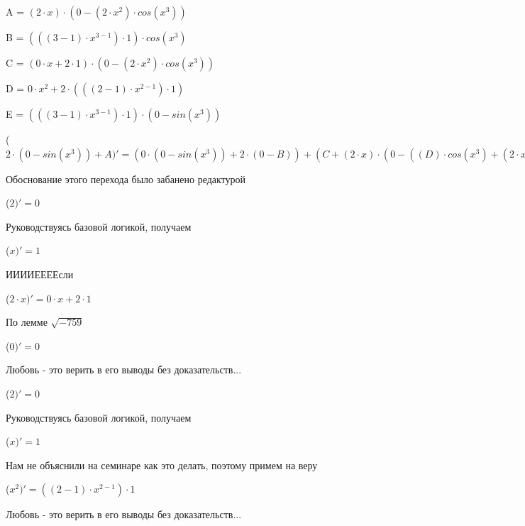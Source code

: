\documentclass[12pt,a4paper,fleqn]{article}
\begin{document}
\begin{center}
A = $(2 \cdot x) \cdot (0-(2 \cdot x^{2}) \cdot cos(x^{3}))$\end{center}
\begin{center}
B = $(((3-1) \cdot x^{3-1}) \cdot 1) \cdot cos(x^{3})$\end{center}
\begin{center}
C = $(0 \cdot x+2 \cdot 1) \cdot (0-(2 \cdot x^{2}) \cdot cos(x^{3}))$\end{center}
\begin{center}
D = $0 \cdot x^{2}+2 \cdot (((2-1) \cdot x^{2-1}) \cdot 1)$\end{center}
\begin{center}
E = $(((3-1) \cdot x^{3-1}) \cdot 1) \cdot (0-sin(x^{3}))$\end{center}
\begin{center}
 ($2 \cdot (0-sin(x^{3}))+A)'
  = (0 \cdot (0-sin(x^{3}))+2 \cdot (0-B))+(C+(2 \cdot x) \cdot (0-((D) \cdot cos(x^{3})+(2 \cdot x^{2}) \cdot (E))))$\end{center}
Обоснование этого перехода было забанено редактурой

\begin{center}
 ($2)'
  = 0$\end{center}
Руководствуясь базовой логикой, получаем

\begin{center}
 ($x)'
  = 1$\end{center}
ИИИИЕЕЕЕсли\cite{link3}

\begin{center}
 ($2 \cdot x)'
  = 0 \cdot x+2 \cdot 1$\end{center}
По лемме $\sqrt{-759}$
\begin{center}
 ($0)'
  = 0$\end{center}
Любовь - это верить в его выводы без доказательств...

\begin{center}
 ($2)'
  = 0$\end{center}
Руководствуясь базовой логикой, получаем

\begin{center}
 ($x)'
  = 1$\end{center}
Нам не объяснили на семинаре как это делать, поэтому примем на веру

\begin{center}
 ($x^{2})'
  = ((2-1) \cdot x^{2-1}) \cdot 1$\end{center}
Любовь - это верить в его выводы без доказательств...
\end{document}
